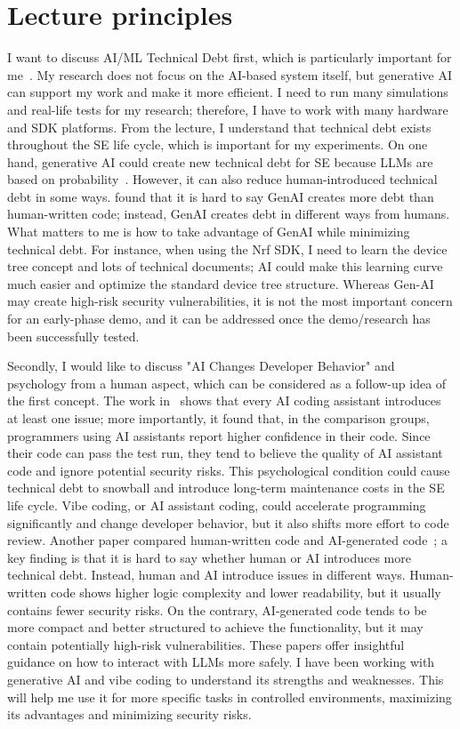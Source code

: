 \documentclass[11pt]{article}
\begin{document}
\section{Lecture principles}
I want to discuss AI/ML Technical Debt first, which is particularly important for me~\cite{technical_debt}. My research does not focus on the AI-based system itself, but generative AI can support my work and make it more efficient. I need to run many simulations and real-life tests for my research; therefore, I have to work with many hardware and SDK platforms. From the lecture, I understand that technical debt exists throughout the SE life cycle, which is important for my experiments. 
On one hand, generative AI could create new technical debt for SE because LLMs are based on probability~\cite{technical_debt}. However, it can also reduce human-introduced technical debt in some ways. \cite{technical_debt} found that it is hard to say GenAI creates more debt than human-written code; instead, GenAI creates debt in different ways from humans. What matters to me is how to take advantage of GenAI while minimizing technical debt. For instance, when using the Nrf SDK, I need to learn the device tree concept and lots of technical documents; AI could make this learning curve much easier and optimize the standard device tree structure. Whereas Gen-AI may create high-risk security vulnerabilities, it is not the most important concern for an early-phase demo, and it can be addressed once the demo/research has been successfully tested. 

Secondly, I would like to discuss "AI Changes Developer Behavior" and psychology from a human aspect, which can be considered as a follow-up idea of the first concept. The work in~\cite{AIcode_insecure} shows that every AI coding assistant introduces at least one issue; more importantly, it found that, in the comparison groups, programmers using AI assistants report higher confidence in their code. Since their code can pass the test run, they tend to believe the quality of AI assistant code and ignore potential security risks. This psychological condition could cause technical debt to snowball and introduce long-term maintenance costs in the SE life cycle. Vibe coding, or AI assistant coding, could accelerate programming significantly and change developer behavior, but it also shifts more effort to code review. Another paper compared human-written code and AI-generated code~\cite{2025humanwrittenvsaigeneratedcode}; a key finding is that it is hard to say whether human or AI introduces more technical debt. Instead, human and AI introduce issues in different ways. Human-written code shows higher logic complexity and lower readability, but it usually contains fewer security risks. On the contrary, AI-generated code tends to be more compact and better structured to achieve the functionality, but it may contain potentially high-risk vulnerabilities. These papers offer insightful guidance on how to interact with LLMs more safely. I have been working with generative AI and vibe coding to understand its strengths and weaknesses. This will help me use it for more specific tasks in controlled environments, maximizing its advantages and minimizing security risks.
\end{document}
